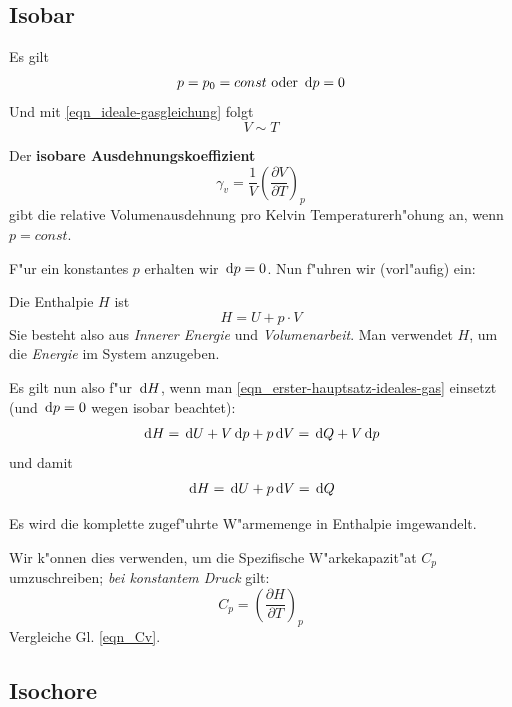 \subsection{Isobar}
\label{kap_isobar}

Es gilt
$$
p = p_0 = const \text{ oder } { \ensuremath{\, \mathrm{d}}p = 0}
$$
Und mit \eqref{eqn_ideale-gasgleichung} folgt
$$
V \sim T
$$

Der \textbf{isobare Ausdehnungskoeffizient}
\begin{equation}
   \label{eqn_isobarer-ausdehnungskoeffizient}
   \gamma_v = \frac{1}{V} \left ( \frac{\partial V}{\partial T }
   \right )_p
\end{equation}
gibt die relative Volumenausdehnung pro Kelvin Temperaturerh"ohung an,
wenn $p = const$.


F"ur ein konstantes $p$ erhalten wir $\, \mathrm{d} p = 0$. Nun f"uhren wir (vorl"aufig)
ein:
\begin{Def}
Die Enthalpie $H$ ist
\begin{equation}
   \label{eqn_entropie}
   H = U + p \cdot V 
\end{equation}
Sie besteht also aus \emph{Innerer Energie} und
\emph{Volumenarbeit}. Man verwendet $H$, um die \emph{Energie} im
System anzugeben.
\end{Def}

Es gilt nun also f"ur $\, \mathrm{d} H$, wenn man
\eqref{eqn_erster-hauptsatz-ideales-gas} einsetzt (und $\, \mathrm{d} p = 0$
wegen isobar beachtet):
$$
\, \mathrm{d} H = \, \mathrm{d} U + V \, \mathrm{d} p + p \, \mathrm{d} V = \, \mathrm{d} Q + V \, \mathrm{d} p
$$
und damit
\begin{equation}
   \label{eq:4}
   \, \mathrm{d} H = \, \mathrm{d} U + p \, \mathrm{d} V = \, \mathrm{d} Q
\end{equation}
\begin{Wichtig}
   Es wird die komplette zugef"uhrte W"armemenge in Enthalpie imgewandelt.
\end{Wichtig}
Wir k"onnen dies verwenden, um die Spezifische W"arkekapazit"at $C_p$
umzuschreiben; \emph{bei konstantem Druck} gilt:
\begin{equation}
   \label{eqn_Cp}
   C_p = \left ( \frac{\partial H }{\partial T} \right )_p
\end{equation}
Vergleiche Gl. \eqref{eqn_Cv}.






\subsection{Isochore}
\label{kap_isochore}

